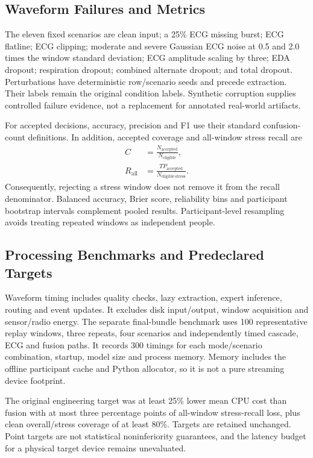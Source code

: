 \documentclass[conference,a4paper]{IEEEtran}
\newcommand{\pct}{\%}
\begin{document}
\subsection{Waveform Failures and Metrics}
The eleven fixed scenarios are clean input; a 25\pct{} ECG missing burst; ECG flatline; ECG clipping; moderate and severe Gaussian ECG noise at 0.5 and 2.0 times the window standard deviation; ECG amplitude scaling by three; EDA dropout; respiration dropout; combined alternate dropout; and total dropout. Perturbations have deterministic row/scenario seeds and precede extraction. Their labels remain the original condition labels. Synthetic corruption supplies controlled failure evidence, not a replacement for annotated real-world artifacts.

For accepted decisions, accuracy, precision and F1 use their standard confusion-count definitions. In addition, accepted coverage and all-window stress recall are
\begin{align}
C&=\frac{N_{\mathrm{accepted}}}{N_{\mathrm{eligible}}},\\
R_{\mathrm{all}}&=\frac{TP_{\mathrm{accepted}}}{N_{\mathrm{eligible\ stress}}}.
\end{align}
Consequently, rejecting a stress window does not remove it from the recall denominator. Balanced accuracy, Brier score, reliability bins and participant bootstrap intervals complement pooled results. Participant-level resampling avoids treating repeated windows as independent people.

\subsection{Processing Benchmarks and Predeclared Targets}
Waveform timing includes quality checks, lazy extraction, expert inference, routing and event updates. It excludes disk input/output, window acquisition and sensor/radio energy. The separate final-bundle benchmark uses 100 representative replay windows, three repeats, four scenarios and independently timed cascade, ECG and fusion paths. It records 300 timings for each mode/scenario combination, startup, model size and process memory. Memory includes the offline participant cache and Python allocator, so it is not a pure streaming device footprint.

The original engineering target was at least 25\pct{} lower mean CPU cost than fusion with at most three percentage points of all-window stress-recall loss, plus clean overall/stress coverage of at least 80\pct{}. Targets are retained unchanged. Point targets are not statistical noninferiority guarantees, and the latency budget for a physical target device remains unevaluated.
\end{document}
